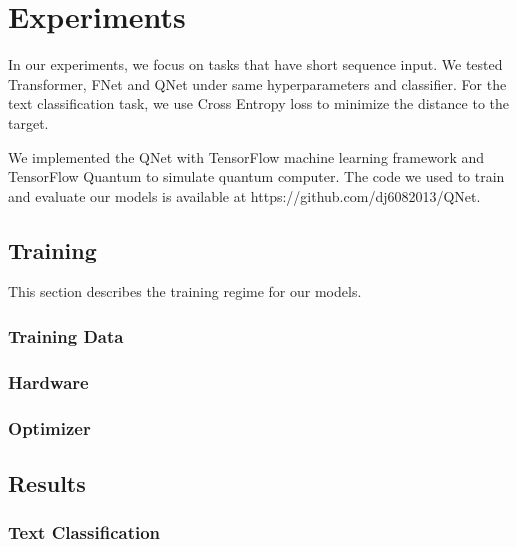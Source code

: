 \section{Experiments}

In our experiments, we focus on tasks that have short sequence input. We tested Transformer, FNet and QNet under same hyperparameters and classifier. For the text classification task, we use Cross Entropy loss to minimize the distance to the target.

We implemented the QNet with TensorFlow machine learning framework and TensorFlow Quantum to simulate quantum computer. The code we used to train and evaluate our models is available at https://github.com/dj6082013/QNet.

\subsection{Training}

This section describes the training regime for our models.

\subsubsection{Training Data}

\subsubsection{Hardware}

\subsubsection{Optimizer}

\subsection{Results}

\subsubsection{Text Classification}
